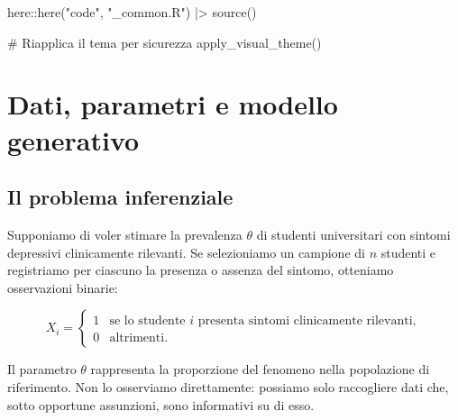 \documentclass[
  italian,
  letterpaper,
  a4paper,
  11pt,
  open=any]{scrbook}
\newenvironment{Shaded}{\begin{snugshade}}{\end{snugshade}}
\newcommand{\CommentTok}[1]{\textcolor[rgb]{0.37,0.37,0.37}{#1}}
\newcommand{\FunctionTok}[1]{\textcolor[rgb]{0.28,0.35,0.67}{#1}}
\newcommand{\NormalTok}[1]{\textcolor[rgb]{0.00,0.23,0.31}{#1}}
\newcommand{\SpecialCharTok}[1]{\textcolor[rgb]{0.37,0.37,0.37}{#1}}
\newcommand{\StringTok}[1]{\textcolor[rgb]{0.13,0.47,0.30}{#1}}
\theoremstyle{plain}
\theoremstyle{definition}
\theoremstyle{definition}
\theoremstyle{remark}
\begin{document}
\begin{tcolorbox}[enhanced jigsaw, arc=.35mm, bottomrule=.15mm, bottomtitle=1mm, breakable, colback=white, colbacktitle=quarto-callout-caution-color!10!white, colframe=quarto-callout-caution-color-frame, coltitle=black, left=2mm, leftrule=.75mm, opacityback=0, opacitybacktitle=0.6, rightrule=.15mm, title=\textcolor{quarto-callout-caution-color}{\faFire}\hspace{0.5em}{Preparazione del Notebook}, titlerule=0mm, toprule=.15mm, toptitle=1mm]

\begin{Shaded}
\begin{Highlighting}[]
\NormalTok{here}\SpecialCharTok{::}\FunctionTok{here}\NormalTok{(}\StringTok{"code"}\NormalTok{, }\StringTok{"\_common.R"}\NormalTok{) }\SpecialCharTok{|\textgreater{}} 
  \FunctionTok{source}\NormalTok{()}

\CommentTok{\# Riapplica il tema per sicurezza}
\FunctionTok{apply\_visual\_theme}\NormalTok{()}
\end{Highlighting}
\end{Shaded}

\end{tcolorbox}

\section{Dati, parametri e modello
generativo}\label{sec-data-parameters-generative-model}

\subsection{Il problema inferenziale}\label{il-problema-inferenziale}

Supponiamo di voler stimare la prevalenza \(\theta\) di studenti
universitari con sintomi depressivi clinicamente rilevanti. Se
selezioniamo un campione di \(n\) studenti e registriamo per ciascuno la
presenza o assenza del sintomo, otteniamo osservazioni binarie:

\[
X_i =
\begin{cases}
1 & \text{se lo studente } i \text{ presenta sintomi clinicamente rilevanti}, \\
0 & \text{altrimenti}.
\end{cases}
\]

Il parametro \(\theta\) rappresenta la proporzione del fenomeno nella
popolazione di riferimento. Non lo osserviamo direttamente: possiamo
solo raccogliere dati che, sotto opportune assunzioni, sono informativi
su di esso.
\end{document}

